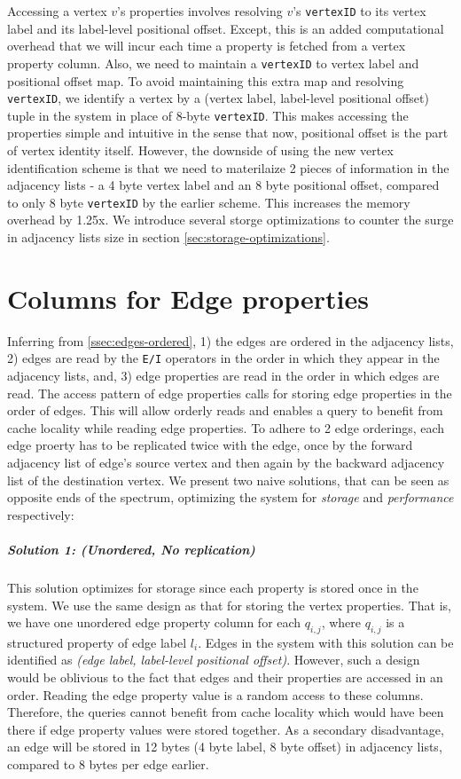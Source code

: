 Accessing a vertex $v$'s properties involves resolving $v$'s \texttt{vertexID} to its vertex label and its label-level positional offset. Except, this is an added computational overhead that we will incur each time a property is fetched from a vertex property column. Also, we need to maintain a \texttt{vertexID} to vertex label and positional offset map. To avoid maintaining this extra map and resolving \texttt{vertexID}, we identify a vertex by a (vertex label, label-level positional offset) tuple in the system in place of 8-byte \texttt{vertexID}. This makes accessing the properties simple and intuitive in the sense that now, positional offset is the part of vertex identity itself. However, the downside of using the new vertex identification scheme is that we need to materilaize 2 pieces of information in the adjacency lists - a 4 byte vertex label and an 8 byte positional offset, compared to only 8 byte \texttt{vertexID} by the earlier scheme. This increases the memory overhead by 1.25x. We introduce several storge optimizations to counter the surge in adjacency lists size in section \ref{sec:storage-optimizations}.

\section{Columns for Edge properties}
\label{sec:edge-property-columns}

Inferring from \ref{ssec:edges-ordered}, 1) the edges are ordered in the adjacency lists, 2) edges are read by the \texttt{E/I} operators in the order in which they appear in the adjacency lists, and, 3) edge properties are read in the order in which edges are read. The access pattern of edge properties calls for storing edge properties in the order of edges. This will allow orderly reads and enables a query to benefit from cache locality while reading edge properties. To adhere to 2 edge orderings, each edge proerty has to be replicated twice with the edge, once by the forward adjacency list of edge's source vertex and then again by the backward adjacency list of the destination vertex. We present two naive solutions, that can be seen as opposite ends of the spectrum, optimizing the system for \emph{storage} and \emph{performance} respectively:

\vspace{-12pt}
\subparagraph{Solution 1: (Unordered, No replication) } This solution optimizes for storage since each property is stored once in the system. We use the same design as that for storing the vertex properties. That is, we have one unordered edge property column for each $q_{i,j}$, where $q_{i,j}$ is a structured property of edge label $l_i$. Edges in the system with this solution can be identified as \emph{(edge label, label-level positional offset)}. However, such a design would be oblivious to the fact that edges and their properties are accessed in an order. Reading the edge property value is a random access to these columns. Therefore, the queries cannot benefit from cache locality which would have been there if edge property values were stored together. As a secondary disadvantage, an edge will be stored in 12 bytes (4 byte label, 8 byte offset) in adjacency lists, compared to 8 bytes per edge earlier.

